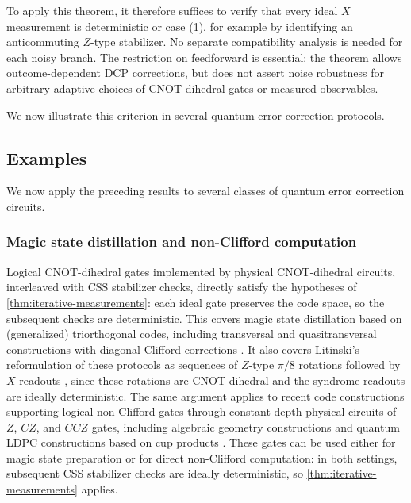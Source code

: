 To apply this theorem, it therefore suffices to verify that every ideal $X$ measurement is deterministic or case (1), for example by identifying an anticommuting $Z$-type stabilizer. No separate compatibility analysis is needed for each noisy branch. The restriction on feedforward is essential: the theorem allows outcome-dependent DCP corrections, but does not assert noise robustness for arbitrary adaptive choices of CNOT-dihedral gates or measured observables.

We now illustrate this criterion in several quantum error-correction protocols.

\subsection{Examples}

We now apply the preceding results to several classes of quantum error correction circuits.

\subsubsection{Magic state distillation and non-Clifford computation}

Logical CNOT-dihedral gates implemented by physical CNOT-dihedral circuits, interleaved with CSS stabilizer checks, directly satisfy the hypotheses of \cref{thm:iterative-measurements}: each ideal gate preserves the code space, so the subsequent checks are deterministic.
This covers magic state distillation based on (generalized) triorthogonal codes, including transversal and quasitransversal constructions with diagonal Clifford corrections \cite{bravyi2005universal,bravyi2012magic, campbell2017unified, haah2018codes, scruby2025quantum, vuillot2022quantum, zhu2025nonclifford}.
It also covers Litinski's reformulation of these protocols as sequences of $Z$-type $\pi/8$ rotations followed by $X$ readouts \cite{litinski2019magic}, since these rotations are CNOT-dihedral and the syndrome readouts are ideally deterministic.
The same argument applies to recent code constructions supporting logical non-Clifford gates through constant-depth physical circuits of $Z$, $CZ$, and $CCZ$ gates, including algebraic geometry constructions \cite{golowich2024asymptotically, golowich2024quantum, he2025asymptotically, nguyen2024good, wills2024constantoverhead, wills2026improved, zhu2025nonclifford} and quantum LDPC constructions based on cup products \cite{bauer2026planar, breuckmann2026cups, davydova2026universal, fuente2026highthreshold, tiew2026copycup}.
These gates can be used either for magic state preparation or for direct non-Clifford computation: in both settings, subsequent CSS stabilizer checks are ideally deterministic, so \cref{thm:iterative-measurements} applies.

